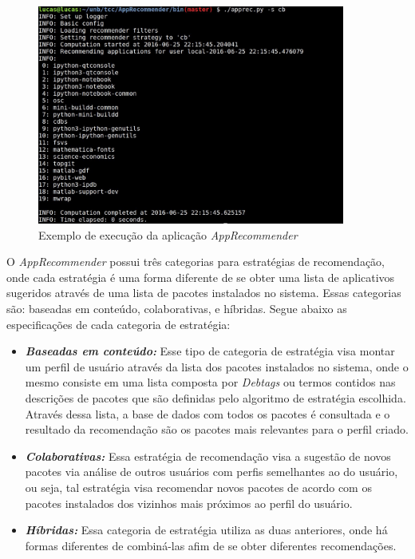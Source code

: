   \begin{figure}[h]
    \centering
    \includegraphics[width=0.9\textwidth]{figuras/apprecommender_execucao.eps}
    \caption{Exemplo de execução da aplicação \textit{AppRecommender}}
    \label{fig:apprecommender_execucao}
  \end{figure}

  O \textit{AppRecommender} possui três categorias para estratégias de recomendação, onde cada
  estratégia é uma forma diferente de se obter uma lista de aplicativos sugeridos
  através de uma lista de pacotes instalados no sistema. Essas categorias são: baseadas em conteúdo,
  colaborativas, e híbridas. Segue abaixo as especificações de cada categoria de estratégia:

  \begin{itemize}
      \item \textit{\textbf{Baseadas em conteúdo:}} Esse tipo de categoria de estratégia
          visa montar um perfil de usuário através da lista dos pacotes instalados no sistema,
          onde o mesmo consiste em uma lista composta por \textit{Debtags} ou termos contidos nas descrições de pacotes que são
          definidas pelo algoritmo de estratégia escolhida. Através dessa lista, a base de dados
          com todos os pacotes é consultada e o resultado da recomendação são os pacotes mais
          relevantes para o perfil criado.
      \item \textit{\textbf{Colaborativas:}} Essa estratégia de recomendação visa
          a sugestão de novos pacotes via análise de outros usuários com perfis
          semelhantes ao do usuário, ou seja, tal estratégia visa recomendar novos
          pacotes de acordo com os pacotes instalados dos vizinhos mais próximos
          ao perfil do usuário.
      \item \textit{\textbf{Híbridas:}} Essa categoria
          de estratégia utiliza as duas anteriores, onde há formas diferentes de combiná-las
          afim de se obter diferentes recomendações.
  \end{itemize}

